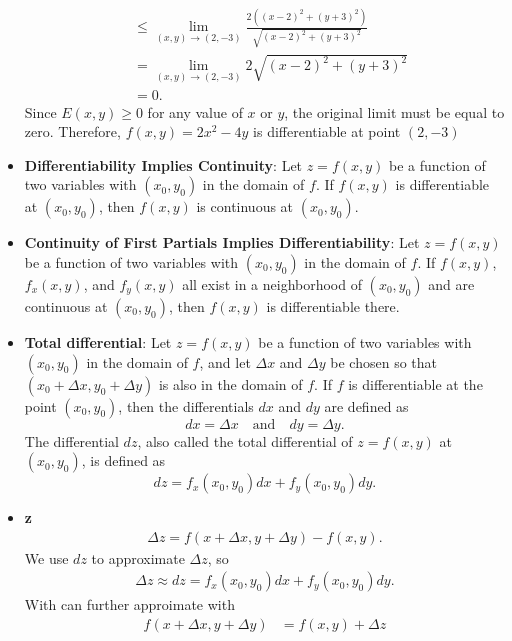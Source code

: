 \documentclass{report}
\begin{document}
\begin{itemize}
\begin{align*}
            &\leq \lim\limits_{(x,y) \to (2,-3)}{\frac{2((x-2)^{2}+(y+3)^{2})}{\sqrt{(x-2)^{2}+(y+3)^{2}}}} \\
            &=\lim\limits_{(x,y) \to (2,-3)}{2\sqrt{(x-2)^{2} + (y+3)^{2}}} \\
            &=0
            .\end{align*}
            \bigbreak \noindent 
            Since $E(x,y) \geq 0$ for any value of $x$ or $y$, the original limit must be equal to zero. Therefore, $f(x,y) = 2x^{2}-4y$ is differentiable  at point $(2,-3) $
        \item \textbf{Differentiability Implies Continuity}:
        Let \(z = f(x,y)\) be a function of two variables with \((x_0,y_0)\) in the domain of \(f\). If \(f(x,y)\) is differentiable at \((x_0,y_0)\), then \(f(x,y)\) is continuous at \((x_0,y_0)\).
    \item \textbf{Continuity of First Partials Implies Differentiability}:
        Let \(z = f(x,y)\) be a function of two variables with \((x_0,y_0)\) in the domain of \(f\). If \(f(x,y)\), \(f_x(x,y)\), and \(f_y(x,y)\) all exist in a neighborhood of \((x_0,y_0)\) and are continuous at \((x_0,y_0)\), then \(f(x,y)\) is differentiable there.
    \item \textbf{Total differential}:
        Let \(z = f(x,y)\) be a function of two variables with \((x_0,y_0)\) in the domain of \(f\), and let \(\Delta x\) and \(\Delta y\) be chosen so that \((x_0 + \Delta x, y_0 + \Delta y)\) is also in the domain of \(f\). If \(f\) is differentiable at the point \((x_0,y_0)\), then the differentials \(dx\) and \(dy\) are defined as
        \[dx = \Delta x \quad \text{and} \quad dy = \Delta y.\]
        The differential \(dz\), also called the total differential of \(z = f(x,y)\) at \((x_0,y_0)\), is defined as
        \[dz = f_x(x_0,y_0)dx + f_y(x_0,y_0)dy.\]
    \item \textbf{\Delta z}
        \begin{align*}
            \Delta z = f(x+\Delta x, y+\Delta y) - f(x,y)
        .\end{align*}
        \bigbreak \noindent 
        We use  $dz$ to approximate  $\Delta z$, so
        \begin{align*}
            \Delta z \approx dz = f_{x}(x_{0},y_{0})dx + f_{y}(x_{0},y_{0})dy
        .\end{align*}
        With can further approimate with
        \begin{align*}
            f(x + \Delta x, y+\Delta y)  &= f(x,y) + \Delta z \\

\end{align*}
\end{itemize}
\end{document}
